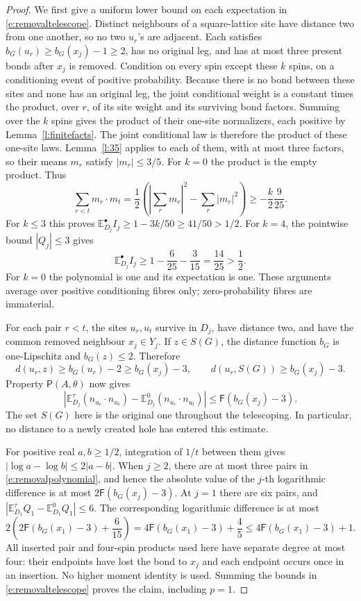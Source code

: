\begin{proof}
We first give a uniform lower bound on each expectation in
\eqref{e:removaltelescope}.  Distinct neighbours of a square-lattice
site have distance two from one another, so no two \(u_r\)'s are
adjacent.  Each satisfies \(b_G(u_r)\ge b_G(x_j)-1\ge2\),
has no original leg, and has at most three present bonds after
\(x_j\) is removed.  Condition on every spin except these
\(k\) spins, on a conditioning event of positive probability.
Because there is no bond between these sites and none has an original
leg, the joint conditional weight is a constant times the product,
over \(r\), of its site weight and its surviving bond factors.
Summing over the \(k\) spins gives the product of their one-site
normalizers, each positive by Lemma~\ref{l:finitefacts}.
The joint conditional law is therefore the product of these
one-site laws.  Lemma~\ref{l:35} applies to each of them, with at
most three factors, so their means \(m_r\) satisfy \(|m_r|\le3/5\).
For \(k=0\) the product is the empty product.  Thus
\[
 \sum_{r<t}m_r\cdot m_t
    =\frac12\left(\left|\sum_r m_r\right|^2
                                  -\sum_r|m_r|^2\right)
    \ge-\frac{k}{2}\frac9{25}.
\]
For \(k\le3\) this proves
\(\mathbb E_{D_j}^\bullet I_j\ge1-3k/50\ge41/50>1/2\).
For \(k=4\), the pointwise bound \(|Q_j|\le3\) gives
\[
 \mathbb E_{D_j}^\bullet I_j
       \ge1-\frac6{25}-\frac3{15}
       =\frac{14}{25}>\frac12.
\]
For \(k=0\) the polynomial is one and its expectation is one.
These arguments average over positive conditioning fibres only;
zero-probability fibres are immaterial.

For each pair \(r<t\), the sites \(u_r,u_t\) survive in
\(D_j\), have distance two, and have the common removed neighbour
\(x_j\in Y_j\).  If \(z\in S(G)\), the distance function
\(b_G\) is one-Lipschitz and \(b_G(z)\le2\).  Therefore
\[
 d(u_r,z)\ge b_G(u_r)-2\ge b_G(x_j)-3,
 \qquad d(u_r,S(G))\ge b_G(x_j)-3.
\]
Property \(\mathsf P(A,\theta)\) now gives
\[
 \left|\mathbb E_{D_j}^\tau(n_{u_r}\cdot n_{u_t})
             -\mathbb E_{D_j}^0(n_{u_r}\cdot n_{u_t})\right|
       \le \mathsf F(b_G(x_j)-3).
\]
The set \(S(G)\) here is the original one throughout the
telescoping.  In particular, no distance to a newly created hole
has entered this estimate.

For positive real \(a,b\ge1/2\), integration of \(1/t\)
between them gives \(|\log a-\log b|\le2|a-b|\).
When \(j\ge2\), there are at most three pairs in
\eqref{e:removalpolynomial}, and hence the absolute value of
the \(j\)-th logarithmic difference is at most
\(2\mathsf F(b_G(x_j)-3)\).  At \(j=1\) there are six pairs,
and \(|\mathbb E_{D_1}^\tau Q_1-\mathbb E_{D_1}^0Q_1|\le6\).
The corresponding logarithmic difference is at most
\[
 2\left(2\mathsf F(b_G(x_1)-3)+\frac6{15}\right)
       =4\mathsf F(b_G(x_1)-3)+\frac45
       \le4\mathsf F(b_G(x_1)-3)+1.
\]
All inserted pair and four-spin products used here have separate
degree at most four: their endpoints have lost the bond to \(x_j\)
and each endpoint occurs once in an insertion.  No higher moment
identity is used.  Summing the bounds in
\eqref{e:removaltelescope} proves the claim, including \(p=1\).
\end{proof}

